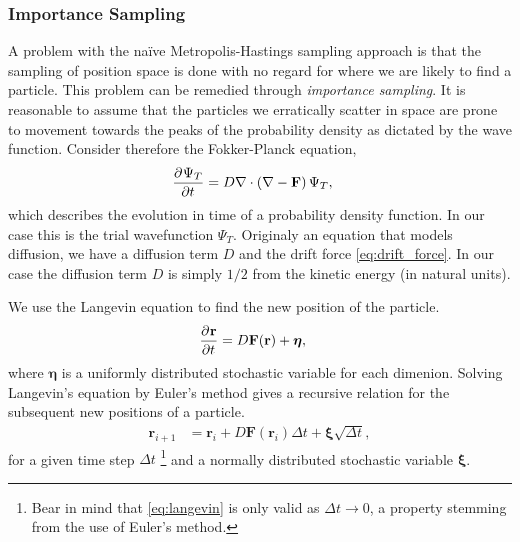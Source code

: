 \documentclass[
    a4paper, aps, twocolumn, floatfix, superscriptaddress, nofootinbib]{revtex4-1}
\newcommand{\vf}{\mathbf}
\newcommand{\vfg}{\boldsymbol}
\newcommand{\1}{\mathds{1}}
\begin{document}
        \subsubsection{Importance Sampling}
            A problem with the naïve Metropolis-Hastings sampling approach is
            that the sampling of position space is done with no regard for where
            we are likely to find a particle. This problem can be remedied
            through \emph{importance sampling}.  It is reasonable to assume that
            the particles we erratically scatter in space are prone to movement
            towards the peaks of the probability density as dictated by the wave
            function. Consider therefore the Fokker-Planck equation,
            \begin{align}
                \dpd[]{\Psi_T}{t}
                &=
                D \nabla\cdot
                \left(
                    \nabla
                    - \vf{F}
                \right) \Psi_T,
                \label{eq:fokker_planck}
            \end{align}
            which describes the evolution in time of a probability density
            function. In our case this is the trial wavefunction $\Psi_T$.
            Originaly an equation that models diffusion, we have a diffusion
            term $D$ and the drift force \autoref{eq:drift_force}. In our case
            the diffusion term $D$ is simply $1/2$ from the kinetic energy (in
            natural units).

            We use the Langevin equation to find the new position of the
            particle.
            \begin{align}
                \dpd[]{\vf{r}}{t}
                &=
                D\vf{F}(\vf{r}) + \vfg{\eta},
                \label{eq:langevin}
            \end{align}
            where $\vfg{\eta}$ is a uniformly distributed stochastic variable
            for each dimenion.  Solving Langevin's equation by Euler's method
            gives a recursive relation for the subsequent new positions of a
            particle.
            \begin{align}
                \vf{r}_{i + 1}
                &=
                \vf{r}_i + D\vf{F}(\vf{r}_i)\Delta t
                + \vfg{\xi}\sqrt{\Delta t},
            \end{align}
            for a given time step $\Delta t$
            \footnote{
                Bear in mind that \autoref{eq:langevin} is only valid as $\Delta
                t \to 0$, a property stemming from the use of Euler's method.
            }
            and a normally distributed stochastic variable $\vfg{\xi}$.
\end{document}
